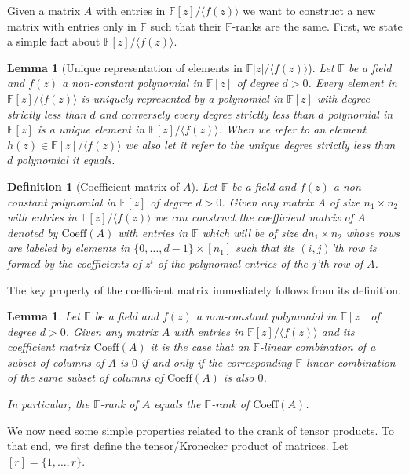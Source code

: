 \documentclass[11pt]{article}
\numberwithin{equation}{section}
\newtheorem{lem}[thm]{Lemma}
\newtheorem{define}[thm]{Definition}
\def\F{{\mathbb{F}}}
\def\Coeff{\text{Coeff}}
\begin{document}
Given a matrix $A$ with entries in $\F[z]/\langle f(z)\rangle$ we want to construct a new matrix with entries only in $\F$ such that their $\F$-ranks are the same. First, we state a simple fact about $\F[z]/\langle f(z)\rangle$.

\begin{lem}[Unique representation of elements in $\F [z\text{]}/\langle f(z)\rangle$]
Let $\F$ be a field and $f(z)$ a non-constant polynomial in $\F[z]$ of degree $d>0$. Every element in $\F[z]/\langle f(z)\rangle$ is uniquely represented by a polynomial in $\F[z]$ with degree strictly less than $d$ and conversely every degree strictly less than $d$ polynomial in $\F[z]$ is a unique element in $\F[z]/\langle f(z)\rangle$. When we refer to an element $h(z)\in \F[z]/\langle f(z)\rangle$ we also let it refer to the unique degree strictly less than $d$ polynomial it equals.
\end{lem}



\begin{define}[Coefficient matrix of $A$]
Let $\F$ be a field and $f(z)$ a non-constant polynomial in $\F[z]$ of degree $d>0$. Given any matrix $A$ of size $n_1\times n_2$ with entries in $\F[z]/\langle f(z)\rangle$ we can construct the {\em coefficient matrix of $A$} denoted by {\em $\Coeff(A)$} with entries in $\F$ which will be of size $dn_1\times n_2$ whose rows are labeled by elements in $\{0,\hdots,d-1\}\times [n_1]$ such that its $(i,j)$'th row is formed by the coefficients of $z^i$ of the polynomial entries of the $j$'th row of $A$. 
\end{define}

The key property of the coefficient matrix immediately follows from its definition.

\begin{lem}\label{lem:coeffR}
Let $\F$ be a field and $f(z)$ a non-constant polynomial in $\F[z]$ of degree $d>0$. Given any matrix $A$ with entries in $\F[z]/\langle f(z)\rangle$ and its coefficient matrix {\em $\Coeff(A)$} it is the case that an $\F$-linear combination of a subset of columns of $A$ is $0$ if and only if the corresponding $\F$-linear combination of the same subset of columns of {\em $\Coeff(A)$} is also $0$.

In particular, the $\F$-rank of $A$ equals the $\F$-rank of {\em $\Coeff(A)$}.
\end{lem}

We now need some simple properties related to the crank of tensor products. To that end, we first define the tensor/Kronecker product of matrices. Let $[r]=\{1,\hdots,r\}$.
\end{document}
